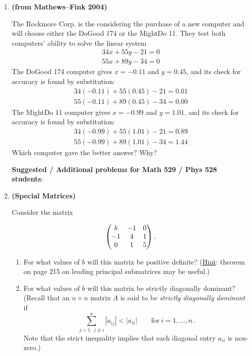 \documentclass [12pt]{article}
\begin{document}
\begin{enumerate}
\begin{enumerate}
\end{enumerate}

\item \textbf{(from Mathews--Fink 2004)}

The Rockmore Corp. is the considering the purchase of a new
computer and will choose either the DoGood 174 or the MightDo 11.
They test both computers' ability to solve the linear system
%
\[
\begin{array}{l}
\displaystyle
 34 x + 55 y - 21 = 0 \\[5pt]
 55 x + 89 y - 34 = 0
\end{array}
\]
The DoGood 174 computer gives $x=-0.11$ and $y=0.45$, and its
check for accuracy is found by substitution:
%
\[
\begin{array}{l}
\displaystyle
 34 (-0.11) + 55 (0.45) - 21 = 0.01 \\[5pt]
 55 (-0.11) + 89 (0.45) - 34 = 0.00
\end{array}
\]
The MightDo 11 computer gives $x=-0.99$ and $y=1.01$, and its
check for accuracy is found by substitution:
%
\[
\begin{array}{l}
\displaystyle
 34 (-0.99) + 55 (1.01) - 21 = 0.89 \\[5pt]
 55 (-0.99) + 89 (1.01) - 34 = 1.44
\end{array}
\]
Which computer gave the better answer? Why?

\bigskip


{\bf Suggested / Additional problems for Math 529 / Phys 528 students}:

\item \textbf{(Special Matrices)}

Consider the matrix

\[
\begin{pmatrix}
b & -1 & 0 \cr -1 & 4 & 1 \cr 0 & 1 & 5
\end{pmatrix}.
\]

\begin{enumerate}

\item For what values of $b$ will this matrix be positive
definite? (\underline{Hint}: theorem on page 215 on leading principal submatrices may be useful.)

\item For what values of $b$ will this matrix be  strictly
diagonally dominant? (Recall that an $n \times n$  matrix $A$ is
said to be {\it strictly diagonally dominant} if
$$
\sum_{j = 1, \; j \neq i}^n \left| a_{ij} \right| < \left| a_{ii}
\right| \qquad \mbox{for} \ i=1,\ldots,n \,.
$$
Note that the strict inequality implies that each diagonal entry
$a_{ii}$ is non-zero.)


\end{enumerate}
\end{enumerate}
\end{document}
